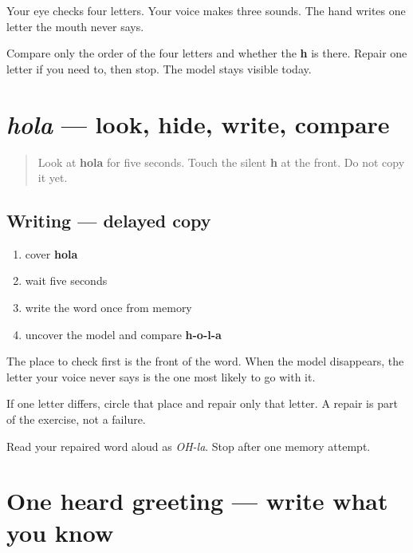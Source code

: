 Your eye checks four letters. Your voice makes three sounds. The hand writes one letter the mouth never says.

\begin{tcolorbox}[breakable,colback=teal!4,colframe=teal!35!black,title={Before you move on}]
Compare only the order of the four letters and whether the \textbf{h} is there. Repair one letter if you need to, then stop. The model stays visible today.
\end{tcolorbox}
\section[hola]{\emph{hola} — look, hide, write, compare}

\label{lesson:ES-W00-hola-delayed-copy}



\begin{quote}
Look at \textbf{hola} for five seconds. Touch the silent \textbf{h} at the front. Do not copy it yet.
\end{quote}

\subsection*{Writing — delayed copy}

\begin{enumerate}
\raggedright
  \item cover \textbf{hola}
  \item wait five seconds
  \item write the word once from memory
  \item uncover the model and compare \textbf{h-o-l-a}
\end{enumerate}

The place to check first is the front of the word. When the model disappears, the letter your voice never says is the one most likely to go with it.

If one letter differs, circle that place and repair only that letter. A repair is part of the exercise, not a failure.

\begin{tcolorbox}[breakable,colback=teal!4,colframe=teal!35!black,title={Before you move on}]
Read your repaired word aloud as \emph{OH-la}. Stop after one memory attempt.
\end{tcolorbox}
\section[hola]{One heard greeting — write what you know}

